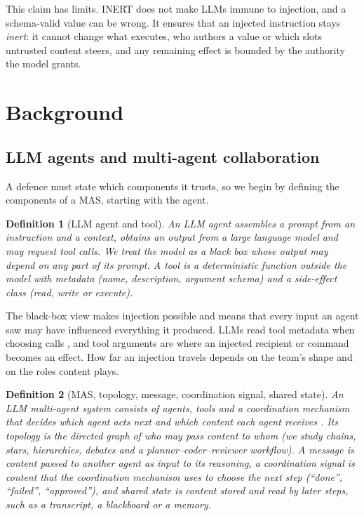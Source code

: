 \documentclass[pdflatex,sn-mathphys-num]{sn-jnl}
\theoremstyle{thmstyleone}%
\theoremstyle{thmstyletwo}%
\theoremstyle{thmstylethree}%
\newtheorem{definition}{Definition}%
\begin{document}
This claim has limits. INERT does not make LLMs immune to injection, and a schema-valid value can be wrong. It ensures that an injected instruction stays \emph{inert}: it cannot change what executes, who authors a value or which slots untrusted content steers, and any remaining effect is bounded by the authority the model grants.

\section{Background}\label{sec:background}

\subsection{LLM agents and multi-agent collaboration}\label{sec:bg-mas}

A defence must state which components it trusts, so we begin by defining the components of a MAS, starting with the agent.

\begin{definition}[LLM agent and tool]\label{def:agent}
An \emph{LLM agent} assembles a prompt from an instruction and a context, obtains an output from a large language model and may request tool calls. We treat the model as a black box whose output may depend on any part of its prompt. A \emph{tool} is a deterministic function outside the model with \emph{metadata} (name, description, argument schema) and a \emph{side-effect class} (read, write or execute).
\end{definition}

The black-box view makes injection possible and means that every input an agent saw may have influenced everything it produced. LLMs read tool metadata when choosing calls \citep{invariant2025toolpoisoning}, and tool arguments are where an injected recipient or command becomes an effect. How far an injection travels depends on the team's shape \citep{hagag2026architecture,Yu2025NetSafeETBB} and on the roles content plays.

\begin{definition}[MAS, topology, message, coordination signal, shared state]\label{def:mas}
An \emph{LLM multi-agent system} consists of agents, tools and a \emph{coordination mechanism} that decides which agent acts next and which content each agent receives \citep{guo2024llmmas}. Its \emph{topology} is the directed graph of who may pass content to whom (we study chains, stars, hierarchies, debates and a planner--coder--reviewer workflow). A \emph{message} is content passed to another agent as input to its reasoning, a \emph{coordination signal} is content that the coordination mechanism uses to choose the next step (``done'', ``failed'', ``approved''), and \emph{shared state} is content stored and read by later steps, such as a transcript, a blackboard or a memory.
\end{definition}
\end{document}
